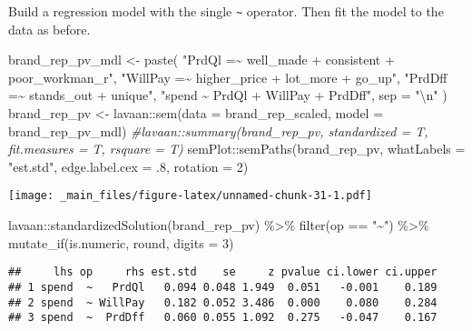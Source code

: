\documentclass[
]{book}
\newenvironment{Shaded}{\begin{snugshade}}{\end{snugshade}}
\newcommand{\AttributeTok}[1]{\textcolor[rgb]{0.77,0.63,0.00}{#1}}
\newcommand{\CommentTok}[1]{\textcolor[rgb]{0.56,0.35,0.01}{\textit{#1}}}
\newcommand{\DecValTok}[1]{\textcolor[rgb]{0.00,0.00,0.81}{#1}}
\newcommand{\FunctionTok}[1]{\textcolor[rgb]{0.00,0.00,0.00}{#1}}
\newcommand{\NormalTok}[1]{#1}
\newcommand{\OtherTok}[1]{\textcolor[rgb]{0.56,0.35,0.01}{#1}}
\newcommand{\SpecialCharTok}[1]{\textcolor[rgb]{0.00,0.00,0.00}{#1}}
\newcommand{\StringTok}[1]{\textcolor[rgb]{0.31,0.60,0.02}{#1}}
\theoremstyle{definition}
\theoremstyle{definition}
\theoremstyle{definition}
\theoremstyle{definition}
\theoremstyle{remark}
\begin{document}
Build a regression model with the single \texttt{\textasciitilde{}} operator. Then fit the model to the data as before.

\begin{Shaded}
\begin{Highlighting}[]
\NormalTok{brand\_rep\_pv\_mdl }\OtherTok{\textless{}{-}} \FunctionTok{paste}\NormalTok{(}
  \StringTok{"PrdQl =\textasciitilde{} well\_made + consistent + poor\_workman\_r"}\NormalTok{,}
  \StringTok{"WillPay =\textasciitilde{} higher\_price + lot\_more + go\_up"}\NormalTok{,}
  \StringTok{"PrdDff =\textasciitilde{} stands\_out + unique"}\NormalTok{,}
  \StringTok{"spend \textasciitilde{} PrdQl + WillPay + PrdDff"}\NormalTok{,}
  \AttributeTok{sep =} \StringTok{"}\SpecialCharTok{\textbackslash{}n}\StringTok{"}
\NormalTok{)}
\NormalTok{brand\_rep\_pv }\OtherTok{\textless{}{-}}\NormalTok{ lavaan}\SpecialCharTok{::}\FunctionTok{sem}\NormalTok{(}\AttributeTok{data =}\NormalTok{ brand\_rep\_scaled, }\AttributeTok{model =}\NormalTok{ brand\_rep\_pv\_mdl)}
\CommentTok{\#lavaan::summary(brand\_rep\_pv, standardized = T, fit.measures = T, rsquare = T)}
\NormalTok{semPlot}\SpecialCharTok{::}\FunctionTok{semPaths}\NormalTok{(brand\_rep\_pv, }\AttributeTok{whatLabels =} \StringTok{"est.std"}\NormalTok{, }\AttributeTok{edge.label.cex =}\NormalTok{ .}\DecValTok{8}\NormalTok{, }\AttributeTok{rotation =} \DecValTok{2}\NormalTok{)}
\end{Highlighting}
\end{Shaded}

\texttt{[image: \_main\_files/figure-latex/unnamed-chunk-31-1.pdf]}

\begin{Shaded}
\begin{Highlighting}[]
\NormalTok{lavaan}\SpecialCharTok{::}\FunctionTok{standardizedSolution}\NormalTok{(brand\_rep\_pv) }\SpecialCharTok{\%\textgreater{}\%} 
  \FunctionTok{filter}\NormalTok{(op }\SpecialCharTok{==} \StringTok{"\textasciitilde{}"}\NormalTok{) }\SpecialCharTok{\%\textgreater{}\%}
  \FunctionTok{mutate\_if}\NormalTok{(is.numeric, round, }\AttributeTok{digits =} \DecValTok{3}\NormalTok{)}
\end{Highlighting}
\end{Shaded}

\begin{verbatim}
##     lhs op     rhs est.std    se     z pvalue ci.lower ci.upper
## 1 spend  ~   PrdQl   0.094 0.048 1.949  0.051   -0.001    0.189
## 2 spend  ~ WillPay   0.182 0.052 3.486  0.000    0.080    0.284
## 3 spend  ~  PrdDff   0.060 0.055 1.092  0.275   -0.047    0.167
\end{verbatim}
\end{document}

